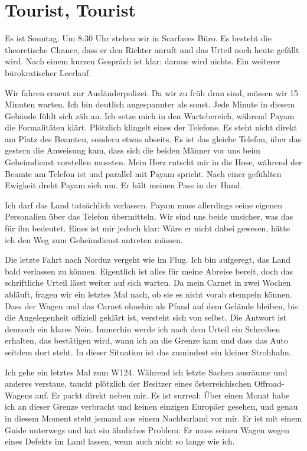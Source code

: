 \chapter*{Tourist, Tourist}

Es ist Sonntag. Um 8:30 Uhr stehen wir in Scarfaces Büro. Es besteht die theoretische Chance, dass er den Richter anruft und das Urteil noch heute gefällt wird. Nach einem kurzen Gespräch ist klar: daraus wird nichts. Ein weiterer bürokratischer Leerlauf.

Wir fahren erneut zur Ausländerpolizei. Da wir zu früh dran sind, müssen wir 15 Minuten warten. Ich bin deutlich angespannter als sonst. Jede Minute in diesem Gebäude fühlt sich zäh an. Ich setze mich in den Wartebereich, während Payam die Formalitäten klärt. Plötzlich klingelt eines der Telefone. Es steht nicht direkt am Platz des Beamten, sondern etwas abseits. Es ist das gleiche Telefon, über das gestern die Anweisung kam, dass sich die beiden Männer vor uns beim Geheimdienst vorstellen mussten. Mein Herz rutscht mir in die Hose, während der Beamte am Telefon ist und parallel mit Payam spricht. Nach einer gefühlten Ewigkeit dreht Payam sich um. Er hält meinen Pass in der Hand.

Ich darf das Land tatsächlich verlassen. Payam muss allerdings seine eigenen Personalien über das Telefon übermitteln. Wir sind uns beide unsicher, was das für ihn bedeutet. Eines ist mir jedoch klar: Wäre er nicht dabei gewesen, hätte ich den Weg zum Geheimdienst antreten müssen.

Die letzte Fahrt nach Norduz vergeht wie im Flug. Ich bin aufgeregt, das Land bald verlassen zu können. Eigentlich ist alles für meine Abreise bereit, doch das schriftliche Urteil lässt weiter auf sich warten. Da mein Carnet in zwei Wochen abläuft, fragen wir ein letztes Mal nach, ob sie es nicht vorab stempeln können. Dass der Wagen und das Carnet ohnehin als Pfand auf dem Gelände bleiben, bis die Angelegenheit offiziell geklärt ist, versteht sich von selbst. Die Antwort ist dennoch ein klares Nein. Immerhin werde ich nach dem Urteil ein Schreiben erhalten, das bestätigen wird, wann ich an die Grenze kam und dass das Auto seitdem dort steht. In dieser Situation ist das zumindest ein kleiner Strohhalm.

Ich gehe ein letztes Mal zum W124. Während ich letzte Sachen ausräume und anderes verstaue, taucht plötzlich der Besitzer eines österreichischen Offroad-Wagens auf. Er parkt direkt neben mir. Es ist surreal: Über einen Monat habe ich an dieser Grenze verbracht und keinen einzigen Europäer gesehen, und genau in diesem Moment steht jemand aus einem Nachbarland vor mir. Er ist mit einem Guide unterwegs und hat ein ähnliches Problem: Er muss seinen Wagen wegen eines Defekts im Land lassen, wenn auch nicht so lange wie ich.

